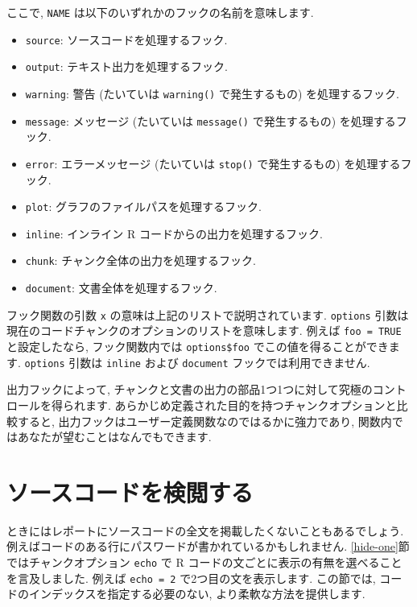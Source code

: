 \documentclass[
  11pt,
  lualatex,
  ja=standard]{bxjsreport}
\begin{document}
ここで, \texttt{NAME} は以下のいずれかのフックの名前を意味します.

\begin{itemize}
\item
  \texttt{source}: ソースコードを処理するフック.
\item
  \texttt{output}: テキスト出力を処理するフック.
\item
  \texttt{warning}: 警告 (たいていは \texttt{warning()} で発生するもの) を処理するフック.
\item
  \texttt{message}: メッセージ (たいていは \texttt{message()} で発生するもの) を処理するフック.
\item
  \texttt{error}: エラーメッセージ (たいていは \texttt{stop()} で発生するもの) を処理するフック.
\item
  \texttt{plot}: グラフのファイルパスを処理するフック.
\item
  \texttt{inline}: インライン R コードからの出力を処理するフック.
\item
  \texttt{chunk}: チャンク全体の出力を処理するフック.
\item
  \texttt{document}: 文書全体を処理するフック.
\end{itemize}

フック関数の引数 \texttt{x} の意味は上記のリストで説明されています. \texttt{options} 引数は現在のコードチャンクのオプションのリストを意味します. 例えば \texttt{foo = TRUE} と設定したなら, フック関数内では \texttt{options\$foo} でこの値を得ることができます. \texttt{options} 引数は \texttt{inline} および \texttt{document} フックでは利用できません.

出力フックによって, チャンクと文書の出力の部品1つ1つに対して究極のコントロールを得られます. あらかじめ定義された目的を持つチャンクオプションと比較すると, 出力フックはユーザー定義関数なのではるかに強力であり, 関数内ではあなたが望むことはなんでもできます.

\hypertarget{hook-hide}{%
\section{ソースコードを検閲する}\label{hook-hide}}

ときにはレポートにソースコードの全文を掲載したくないこともあるでしょう. 例えばコードのある行にパスワードが書かれているかもしれません. \ref{hide-one}節ではチャンクオプション \texttt{echo} で R コードの文ごとに表示の有無を選べることを言及しました. 例えば \texttt{echo = 2} で2つ目の文を表示します. この節では, コードのインデックスを指定する必要のない, より柔軟な方法を提供します.
\end{document}
